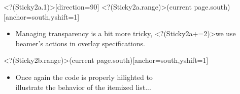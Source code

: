 \transpush<?(Sticky2a.1)>[direction=90]
\Sticky<?(Sticky2a.range)>(current page.south)[anchor=south,yshift=1\baselineskip]{\bfseries%
\begin{minipage}{0.7\textwidth}
\vspace{-0.5\baselineskip}%
\begin{itemize}
\item[\myBulb]Managing transparency is a bit more tricky,
\visible<?(Sticky2a+=2)>{we%
use beamer's actions in overlay specifications.%
}%
\end{itemize}
\end{minipage}
}%
\Sticky<?(Sticky2b.range)>(current page.south)[anchor=south,yshift=1\baselineskip]{\bfseries%
\begin{minipage}{0.7\textwidth}
\vspace{-0.5\baselineskip}%
\begin{itemize}
\item[\myBulb]Once again the code is properly hilighted to\\illustrate the behavior of the itemized list...
\end{itemize}
\end{minipage}
}%
%
